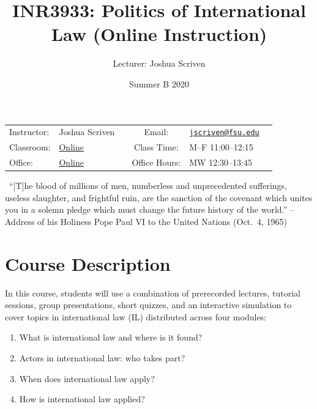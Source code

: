 \documentclass[10pt,]{article}
\title{INR3933: Politics of International Law \textbar{} (Online
Instruction)}
\author{Lecturer: Joshua Scriven}
\date{Summer B 2020}
\providecommand{\tightlist}{%
  \setlength{\itemsep}{0pt}\setlength{\parskip}{0pt}}
\begin{document}
		\maketitle
	

		\thispagestyle{firststyle}

\begin{center}
\begin{tabular}{llccll}
\hline
\rowcolor{Gray}
Instructor: & Joshua Scriven &          \hspace{3cm}           &
Email: & \href{mailto:jscriven@fsu.edu}{\nolinkurl{jscriven@fsu.edu}}\\

Classroom: &  \href{https://fsu.zoom.us/meeting}{Online} & &
Class Time: & M--F 11:00--12:15\\
Office: & \href{https://fsu.zoom.us/meeting}{Online} & &
Office Hours: & MW 12:30--13:45\\
\hline
\end{tabular}

\begin{minipage}{5.2in}
  \begin{flushleft}
    {\color{Gray}{\RectangleBold}} ~{\footnotesize ``{[}T{]}he blood of
millions of men, numberless and unprecedented sufferings, useless
slaughter, and frightful ruin, are the sanction of the covenant which
unites you in a solemn pledge which must change the future history of
the world.'' --Address of his Holiness Pope Paul VI to the United
Nations (Oct.~4, 1965)}\newline
  \end{flushleft}
\end{minipage}


\end{center}

\vspace{2mm}


\hypertarget{course-description}{%
\section{Course Description}\label{course-description}}

In this course, students will use a combination of prerecorded lectures,
tutorial sessions, group presentations, short quizzes, and an
interactive simulation to cover topics in international law (IL)
distributed across four modules:

\begin{enumerate}
\def\labelenumi{\arabic{enumi}.}
\tightlist
\item
  What is international law and where is it found?
\item
  Actors in international law: who takes part?
\item
  When does international law apply?
\item
  How is international law applied?
\end{enumerate}
\end{document}
